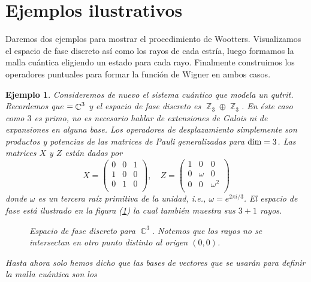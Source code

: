 \documentclass[a4paper,11pt]{report}
\DeclareMathOperator{\C}{\mathbb{C}}
\DeclareMathOperator{\Z}{\mathbb{Z}}
\let\H\relax
\DeclareMathOperator{\H}{\mathcal H}
\newtheorem{example}{Ejemplo}
\begin{document}
  \section{Ejemplos ilustrativos}

  Daremos dos ejemplos para mostrar el procedimiento de
  Wootters. Visualizamos el espacio de fase discreto así
  como los rayos de cada estría, luego formamos la malla
  cuántica eligiendo un estado para cada rayo.  Finalmente
  construimos los operadores puntuales para formar la
  función de Wigner en ambos casos.

  \begin{example}
    Consideremos de nuevo el sistema cuántico que modela un
    qutrit. Recordemos que $\H = \C^{3}$ y el espacio de
    fase discreto es $\Z_3 \oplus \Z_3$. En éste caso como
    $3$ es primo, no es necesario hablar de extensiones de
    Galois ni de expansiones en alguna base. Los operadores
    de desplazamiento simplemente son productos y potencias
    de las matrices de Pauli generalizadas para $\dim \H =
    3$. Las matrices $X$ y $Z$ están dadas por
    \begin{equation}
      X = \begin{pmatrix} 
        0 & 0 & 1 \\
        1 & 0 & 0 \\
        0 & 1 & 0 \\
      \end{pmatrix},
      \quad
      Z = \begin{pmatrix} 
        1 & 0 & 0 \\
        0 & \omega & 0 \\
        0 & 0 & \omega^2 \\
      \end{pmatrix} 
    \end{equation}
    donde $\omega$ es un tercera raíz primitiva de la
    unidad, i.e., $\omega = e^{2\pi i / 3}$. El espacio de
    fase está ilustrado en la figura
    (\ref{fig:qutrit-phase-space}) la cual también muestra
    sus $3 + 1$ rayos. 
    \begin{figure}[ht]
      \centering
      \scalebox{0.6}{
        
      }
      \caption{Espacio de fase discreto para $\C^3$. Notemos
      que los rayos no se intersectan en otro punto distinto
      al origen $(0,0)$.}
      \label{fig:qutrit-phase-space}
    \end{figure}
    Hasta ahora solo hemos dicho que las bases de vectores
    que se usarán para definir la malla cuántica son los

\end{example}
\end{document}
